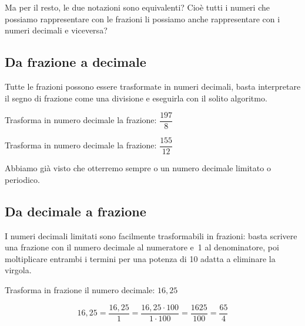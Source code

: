 Ma per il resto, le due notazioni sono equivalenti? Cioè tutti i numeri 
che possiamo rappresentare con le frazioni li possiamo anche 
rappresentare con i numeri decimali e viceversa?


\pagebreak %

\subsection{Da frazione a decimale}

Tutte le frazioni possono essere trasformate in numeri decimali, basta 
interpretare il segno di frazione come una divisione e eseguirla con il 
solito algoritmo.

\begin{esempio}{}{}
Trasforma in numero decimale la frazione: \(\dfrac{197}{8}\)
{\frazdeca}
\end{esempio}

\begin{esempio}{}{}
Trasforma in numero decimale la frazione: \(\dfrac{155}{12}\)
{\frazdecb}
\end{esempio}

Abbiamo già visto che otterremo sempre o un numero decimale limitato o 
periodico.

\subsection{Da decimale a frazione}

I numeri decimali limitati sono facilmente trasformabili in frazioni: basta 
scrivere una frazione con il numero decimale al numeratore e~1 al 
denominatore, 
poi moltiplicare entrambi i termini per una potenza di 10 adatta a 
eliminare la virgola.

\begin{esempio}{}{}
Trasforma in frazione il numero decimale: \(16,25\)
\begin{center}
 \[16,25 = \frac{16,25}{1} = \frac{16,25 \cdot 100}{1 \cdot 100} =
   \frac{1625}{100} = \frac{65}{4}\]
\end{center}
\end{esempio}

